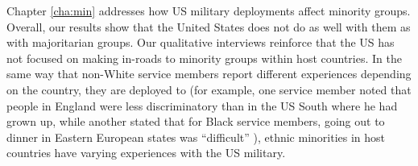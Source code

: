 
Chapter \ref{cha:min} addresses how US military deployments affect minority groups. Overall, our results show that the United States does not do as well with them as with majoritarian groups. Our qualitative interviews reinforce that the US has not focused on making in-roads to minority groups within host countries. In the same way that non-White service members report different experiences depending on the country, they are deployed to (for example, one service member noted that people in England were less discriminatory than in the US South where he had grown up, while another stated that for Black service members, going out to dinner in Eastern European states was ``difficult'' \cite{rafeight20190719,rafseven20190719}), ethnic minorities in host countries have varying experiences with the US military.

